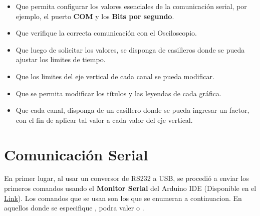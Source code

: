 \begin{itemize}
	\item Que permita configurar los valores esenciales de la comunicación serial, por ejemplo, el puerto \textbf{COM} y los \textbf{Bits por segundo}.
	\item Que verifique la correcta comunicación con el Osciloscopio.
	\item Que luego de solicitar los valores, se disponga de casilleros donde se pueda ajustar los limites de tiempo.
	\item Que los limites del eje vertical de cada canal se pueda modificar.
	\item Que se permita modificar los títulos y las leyendas de cada gráfica.
	\item Que cada canal, disponga de un casillero donde se pueda ingresar un factor, con el fin de aplicar tal valor a cada valor del eje vertical.
\end{itemize}




\section{Comunicación Serial}
En primer lugar, al usar un conversor de RS232 a USB, se procedió a enviar los primeros comandos usando el \textbf{Monitor Serial} del Arduino IDE (Disponible en el \href{https://www.arduino.cc/en/software}{\underline{Link}}).
Los comandos que se usan son los que se enumeran a continuacion. En aquellos donde se especifique , podra valer  o .

